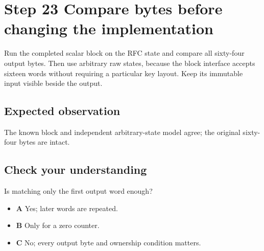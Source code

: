 \section{Step 23 Compare bytes before changing the implementation}\label{chacha-s23}

Run the completed scalar block on the RFC state and compare all sixty-four output bytes. Then use arbitrary raw states, because the block interface accepts sixteen words without requiring a particular key layout. Keep its immutable input visible beside the output.

\subsection{Expected observation}
The known block and independent arbitrary-state model agree; the original sixty-four bytes are intact.

\subsection{Check your understanding}
Is matching only the first output word enough?

\begin{itemize}
  \item \textbf{A} Yes; later words are repeated.
  \item \textbf{B} Only for a zero counter.
  \item \textbf{C} No; every output byte and ownership condition matters.
\end{itemize}

